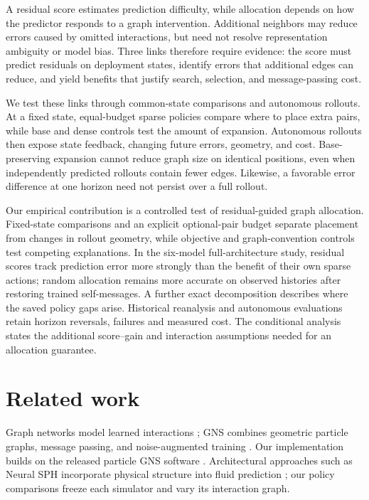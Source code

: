A residual score estimates prediction difficulty, while allocation depends on how the predictor responds to a graph intervention. Additional neighbors may reduce errors caused by omitted interactions, but need not resolve representation ambiguity or model bias. Three links therefore require evidence: the score must predict residuals on deployment states, identify errors that additional edges can reduce, and yield benefits that justify search, selection, and message-passing cost.

We test these links through common-state comparisons and autonomous rollouts. At a fixed state, equal-budget sparse policies compare where to place extra pairs, while base and dense controls test the amount of expansion. Autonomous rollouts then expose state feedback, changing future errors, geometry, and cost. Base-preserving expansion cannot reduce graph size on identical positions, even when independently predicted rollouts contain fewer edges. Likewise, a favorable error difference at one horizon need not persist over a full rollout.

Our empirical contribution is a controlled test of residual-guided graph allocation. Fixed-state comparisons and an explicit optional-pair budget separate placement from changes in rollout geometry, while objective and graph-convention controls test competing explanations. In the six-model full-architecture study, residual scores track prediction error more strongly than the benefit of their own sparse actions; random allocation remains more accurate on observed histories after restoring trained self-messages. A further exact decomposition describes where the saved policy gaps arise. Historical reanalysis and autonomous evaluations retain horizon reversals, failures and measured cost. The conditional analysis states the additional score--gain and interaction assumptions needed for an allocation guarantee.

\section{Related work}
Graph networks model learned interactions \citep{battaglia2016}; GNS combines geometric particle graphs, message passing, and noise-augmented training \citep{sanchez2020}. Our implementation builds on the released particle GNS software \citep{kumar2023}. Architectural approaches such as Neural SPH incorporate physical structure into fluid prediction \citep{toshev2024}; our policy comparisons freeze each simulator and vary its interaction graph.

